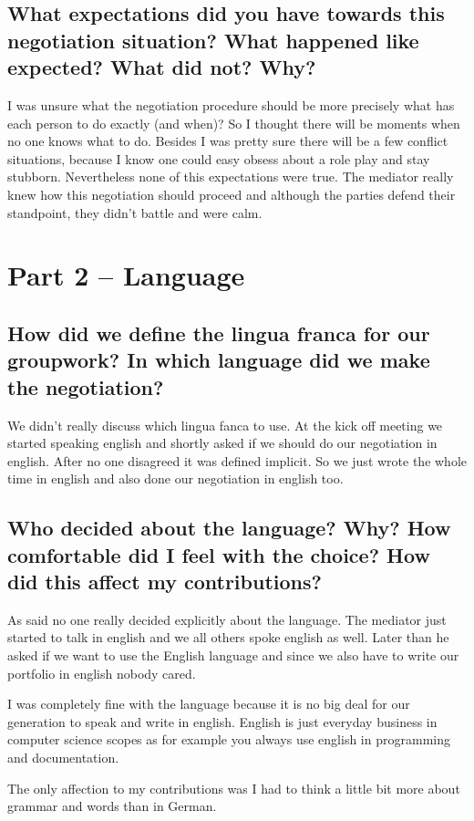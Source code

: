 \documentclass[11pt,fleqn]{book} %
\begin{document}
\subsection{What expectations did you have towards this negotiation situation? What happened like expected? What did not? Why?}
I was unsure what the negotiation procedure should be more precisely what has each person to do exactly (and when)?
So I thought there will be moments when no one knows what to do.
Besides I was pretty sure there will be a few conflict situations, because I know one could easy obsess about a role play and stay stubborn.
Nevertheless none of this expectations were true.
The mediator really knew how this negotiation should proceed and although the parties defend their standpoint, they didn't battle and were calm.

\section{Part 2 – Language}
\subsection{How did we define the lingua franca for our groupwork? In which language did we	make the negotiation?}
We didn't really discuss which lingua fanca to use. At the kick off meeting we started speaking english and shortly asked if we should do our negotiation in english. After no one disagreed it was defined implicit. So we just wrote the whole time in english and also done our negotiation in english too.

\subsection{Who decided about the language? Why? How comfortable did I feel with the choice? How did this affect my contributions?}
As said no one really decided explicitly about the language. The mediator just started to talk in english and we all others spoke english as well. Later than he asked if we want to use the English language and since we also have to write our portfolio in english nobody cared.

I was completely fine with the language because it is no big deal for our generation to speak and write in english.
English is just everyday business in computer science scopes as for example you always use english in programming and documentation.

The only affection to my contributions was I had to think a little bit more about grammar and words than in German.
\end{document}
